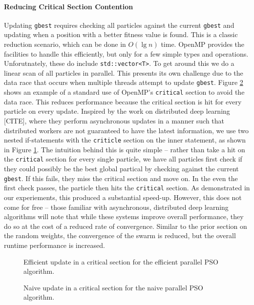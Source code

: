 \paragraph{Reducing Critical Section Contention} Updating \texttt{gbest}
requires checking all particles against the current \texttt{gbest} and updating
when a position with a better fitness value is found. This is a classic
reduction scenario, which can be done in $O(\lg n)$ time. OpenMP provides the
facilities to handle this efficiently, but only for a few simple types and
operations. Unforutnately, these do include \texttt{std::vector<T>}. To get
around this we do a linear scan of all particles in parallel. This presents its
own challenge due to the data race that occurs when multiple threads attempt to
update \texttt{gbest}. Figure \ref{fig:naive-update} shows an example of a
standard use of OpenMP's \texttt{critical} section to avoid the data race. This
reduces performance because the critical section is hit for every particle on
every update. Inspired by the work on distributed deep learning [CITE], where
they perform asynchronous updates in a manner such that distributed workers are
not guaranteed to have the latest information, we use two nested if-statements
with the \texttt{criticle} section on the inner statement, as shown in Figure
\ref{fig:efficient-update}. The intuition behind this is quite simple -- rather
than take a hit on the \texttt{critical} section for every single particle, we
have all particles first check if they could possibly be the best global
partical by checking against the current \texttt{gbest}. If this fails, they
miss the critical section and move on. In the even the first check passes, the
particle then hits the \texttt{critical} section. As demonstrated in our
experiements, this produced a substantial speed-up. However, this does not come
for free -- those familiar with asynchronous, distributed deep learning
algorithms will note that while these systems improve overall performance, they
do so at the cost of a reduced rate of convergence. Similar to the prior section
on the random weights, the convergence of the swarm is reduced, but the overall
runtime performance is increased.

\begin{figure}
  
  \caption{Efficient update in a critical section for the efficient parallel PSO
    algorithm.}
  \label{fig:efficient-update}
\end{figure}

\begin{figure}
  
  \caption{Naive update in a critical section for the naive parallel PSO
    algorithm.}
  \label{fig:naive-update}
\end{figure}

